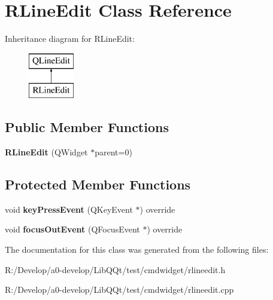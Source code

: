 \hypertarget{class_r_line_edit}{}\section{R\+Line\+Edit Class Reference}
\label{class_r_line_edit}
Inheritance diagram for R\+Line\+Edit\+:\begin{figure}[H]
\begin{center}
\leavevmode
\includegraphics[height=2.000000cm]{class_r_line_edit}
\end{center}
\end{figure}
\subsection*{Public Member Functions}
\begin{DoxyCompactItemize}
\item 
\mbox{\label{class_r_line_edit_a21e73b5556fba927a63f298ceca58d21}} 
{\bfseries R\+Line\+Edit} (Q\+Widget $\ast$parent=0)
\end{DoxyCompactItemize}
\subsection*{Protected Member Functions}
\begin{DoxyCompactItemize}
\item 
\mbox{\label{class_r_line_edit_a433835bc620d2ec9c165b1f2d45fbdd2}} 
void {\bfseries key\+Press\+Event} (Q\+Key\+Event $\ast$) override
\item 
\mbox{\label{class_r_line_edit_aae47d6a884b52e111542fc231f41ecf1}} 
void {\bfseries focus\+Out\+Event} (Q\+Focus\+Event $\ast$) override
\end{DoxyCompactItemize}


The documentation for this class was generated from the following files\+:\begin{DoxyCompactItemize}
\item 
R\+:/\+Develop/a0-\/develop/\+Lib\+Q\+Qt/test/cmdwidget/rlineedit.\+h\item 
R\+:/\+Develop/a0-\/develop/\+Lib\+Q\+Qt/test/cmdwidget/rlineedit.\+cpp\end{DoxyCompactItemize}

